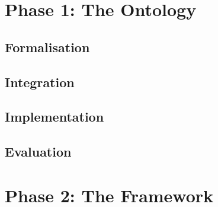 \part{Phase 1: The Ontology}






\chapter{Formalisation}\label{ch:Formalisation}
\chapter{Integration}\label{ch:Integration}
\chapter{Implementation}\label{ch:Implementation}
\chapter{Evaluation}\label{ch:Evaluation}

\part{Phase 2: The Framework}